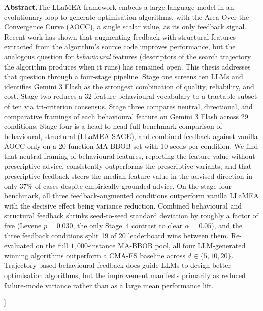 \documentclass[10pt,a4paper,twocolumn]{article}
\begin{document}
{\begin{center}
\begin{minipage}{0.92\textwidth}
\small
\noindent\textbf{Abstract.}\quad The LLaMEA framework embeds a large language model in an evolutionary loop to generate optimisation algorithms, with the Area Over the Convergence Curve (AOCC), a single scalar value, as its only feedback signal. Recent work has shown that augmenting feedback with structural features extracted from the algorithm's source code improves performance, but the analogous question for \emph{behavioural} features (descriptors of the search trajectory the algorithm produces when it runs) has remained open. This thesis addresses that question through a four-stage pipeline. Stage one screens ten LLMs and identifies Gemini 3 Flash as the strongest combination of quality, reliability, and cost. Stage two reduces a 32-feature behavioural vocabulary to a tractable subset of ten via tri-criterion consensus. Stage three compares neutral, directional, and comparative framings of each behavioural feature on Gemini 3 Flash across 29 conditions. Stage four is a head-to-head full-benchmark comparison of behavioural, structural (LLaMEA-SAGE), and combined feedback against vanilla AOCC-only on a 20-function MA-BBOB set with 10 seeds per condition. We find that neutral framing of behavioural features, reporting the feature value without prescriptive advice, consistently outperforms the prescriptive variants, and that prescriptive feedback steers the median feature value in the advised direction in only 37\% of cases despite empirically grounded advice. On the stage four benchmark, all three feedback-augmented conditions outperform vanilla LLaMEA with the decisive effect being variance reduction. Combined behavioural and structural feedback shrinks seed-to-seed standard deviation by roughly a factor of five (Levene $p = 0.030$, the only Stage~4 contrast to clear $\alpha = 0.05$), and the three feedback conditions split 19 of 20 leaderboard wins between them. Re-evaluated on the full $1{,}000$-instance MA-BBOB pool, all four LLM-generated winning algorithms outperform a CMA-ES baseline across $d \in \{5, 10, 20\}$. Trajectory-based behavioural feedback does guide LLMs to design better optimisation algorithms, but the improvement manifests primarily as reduced failure-mode variance rather than as a large mean performance lift.
\end{minipage}
\end{center}
\vspace{0.6cm}
}]












\appendix

\end{document}
